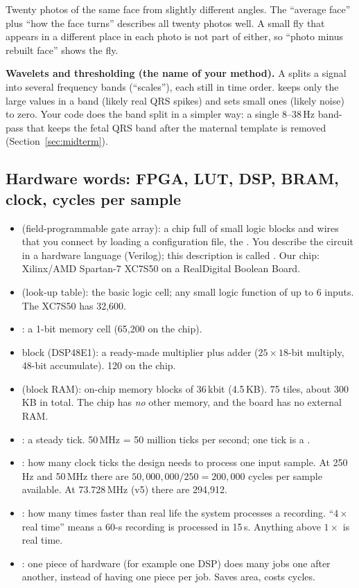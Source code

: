 \documentclass[11pt]{article}
\begin{document}
\begin{analogy}
Twenty photos of the same face from slightly different angles. The ``average face'' plus ``how the face turns'' describes all twenty photos well. A small fly that appears in a different place in each photo is not part of either, so ``photo minus rebuilt face'' shows the fly.
\end{analogy}

\textbf{Wavelets and thresholding (the name of your method).} A  splits a signal into several frequency bands (``scales''), each still in time order.  keeps only the large values in a band (likely real QRS spikes) and sets small ones (likely noise) to zero. Your code does the band split in a simpler way: a single 8--38\,Hz band-pass that keeps the fetal QRS band after the maternal template is removed (Section~\ref{sec:midterm}).

\subsection{Hardware words: FPGA, LUT, DSP, BRAM, clock, cycles per sample}

\begin{itemize}
  \item {} (field-programmable gate array): a chip full of small logic blocks and wires that you connect by loading a configuration file, the . You describe the circuit in a hardware language (Verilog); this description is called . Our chip: Xilinx/AMD Spartan-7 XC7S50 on a RealDigital Boolean Board.
  \item {} (look-up table): the basic logic cell; any small logic function of up to 6 inputs. The XC7S50 has 32,600.
  \item {}: a 1-bit memory cell (65,200 on the chip).
  \item {} block (DSP48E1): a ready-made multiplier plus adder ($25\times18$-bit multiply, 48-bit accumulate). 120 on the chip.
  \item {} (block RAM): on-chip memory blocks of 36\,kbit (4.5\,KB). 75 tiles, about 300\,KB in total. The chip has \emph{no} other memory, and the board has no external RAM.
  \item {}: a steady tick. 50\,MHz = 50 million ticks per second; one tick is a .
  \item {}: how many clock ticks the design needs to process one input sample. At 250\,Hz and 50\,MHz there are $50{,}000{,}000/250 = 200{,}000$ cycles per sample available. At 73.728\,MHz (v5) there are 294,912.
  \item {}: how many times faster than real life the system processes a recording. ``$4\times$ real time'' means a 60-s recording is processed in 15\,s. Anything above $1\times$ is real time.
  \item {}: one piece of hardware (for example one DSP) does many jobs one after another, instead of having one piece per job. Saves area, costs cycles.
\end{itemize}
\end{document}
